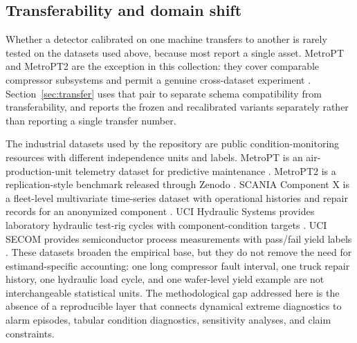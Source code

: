 \subsection{Transferability and domain shift}

Whether a detector calibrated on one machine transfers to another is rarely tested on the datasets used above, because most report a single asset. MetroPT and MetroPT2 are the exception in this collection: they cover comparable compressor subsystems and permit a genuine cross-dataset experiment \citep{Veloso2022MetroPT, MetroPT2Zenodo2023}. Section~\ref{sec:transfer} uses that pair to separate schema compatibility from transferability, and reports the frozen and recalibrated variants separately rather than reporting a single transfer number.

The industrial datasets used by the repository are public condition-monitoring resources with different independence units and labels. MetroPT is an air-production-unit telemetry dataset for predictive maintenance \citep{Veloso2022MetroPT}. MetroPT2 is a replication-style benchmark released through Zenodo \citep{MetroPT2Zenodo2023}. SCANIA Component X is a fleet-level multivariate time-series dataset with operational histories and repair records for an anonymized component \citep{Kharazian2025Scania}. UCI Hydraulic Systems provides laboratory hydraulic test-rig cycles with component-condition targets \citep{Helwig2018HydraulicSystems}. UCI SECOM provides semiconductor process measurements with pass/fail yield labels \citep{McCann2008SECOM}. These datasets broaden the empirical base, but they do not remove the need for estimand-specific accounting: one long compressor fault interval, one truck repair history, one hydraulic load cycle, and one wafer-level yield example are not interchangeable statistical units. The methodological gap addressed here is the absence of a reproducible layer that connects dynamical extreme diagnostics to alarm episodes, tabular condition diagnostics, sensitivity analyses, and claim constraints.
